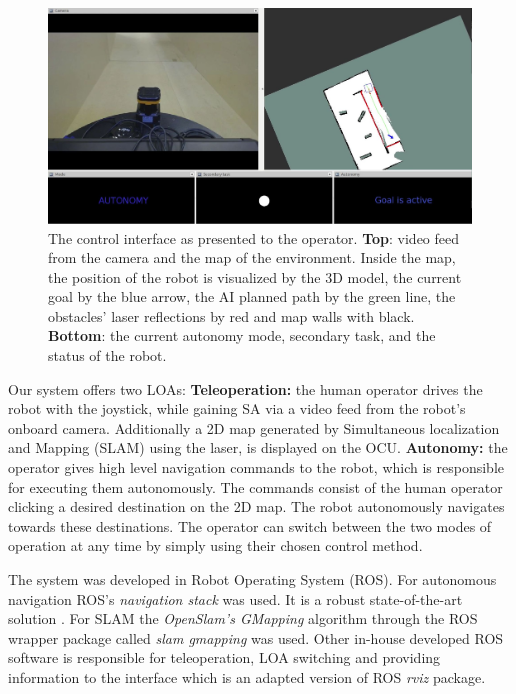 \documentclass[a4paper,12pt,oneside,openright]{bhamthesis}
\begin{document}
\begin{figure}
	\centering
	\includegraphics[width=1\columnwidth]{chapter3_fig/interface_pilot.jpeg}
	\caption{The control interface as presented to the operator. \textbf{Top}: video feed from the camera and the map of the environment. Inside the map, the position of the robot is visualized by the 3D model, the current goal by the blue arrow, the AI planned path by the green line, the obstacles' laser reflections by red and map walls with black. \textbf{Bottom}: the current autonomy mode, secondary task, and the status of the robot. }
	\label{fig:interface_pilot}
\end{figure}

Our system offers two LOAs: \textbf{Teleoperation:} the human operator drives the robot with the joystick, while gaining SA via a video feed from the robot's onboard camera. Additionally a 2D map generated by Simultaneous localization and Mapping (SLAM) using the laser, is displayed on the OCU. \textbf{Autonomy:} the operator gives high level navigation commands to the robot, which is responsible for executing them autonomously. The commands consist of the human operator clicking a desired destination on the 2D map. The robot autonomously navigates towards these destinations. The operator can switch between the two modes of operation at any time by simply using their chosen control method.

The system was developed in Robot Operating System (ROS). For autonomous navigation ROS's \textit{navigation stack} was used. It is a robust state-of-the-art solution \cite{Marder-Eppstein2010}. For SLAM the \textit{OpenSlam's GMapping} algorithm \cite{gmapping} through the ROS wrapper package called \textit{slam gmapping} was used. Other in-house developed ROS software is responsible for teleoperation, LOA switching and providing information to the interface which is an adapted version of ROS  \textit{rviz} package.
\end{document}
